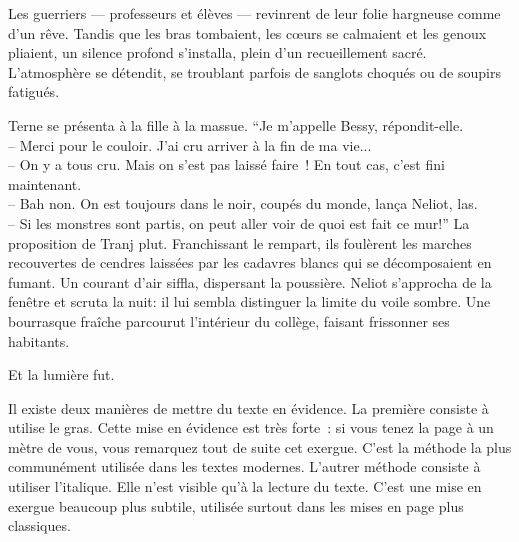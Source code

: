 \documentclass{parch}
\begin{document}
\begin{multicols}{3}
\begin{spacing}{1}
		Les guerriers --- professeurs et élèves --- revinrent de leur folie hargneuse comme d'un rêve. Tandis que les bras tombaient, les c\oe urs se calmaient et les genoux pliaient, un silence profond s'installa, plein d'un recueillement sacré. L'atmosphère se détendit, se troublant parfois de sanglots choqués ou de soupirs fatigués.
		
		Terne se présenta à la fille à la massue. \enquote{Je m'appelle Bessy, répondit-elle.\\
			-- Merci pour le couloir. J'ai cru arriver à la fin de ma vie...\\
			-- On y a tous cru. Mais on s'est pas laissé faire ! En tout cas, c'est fini maintenant.\\
			-- Bah non. On est toujours dans le noir, coupés du monde, lança Neliot, las.\\
			-- Si les monstres sont partis, on peut aller voir de quoi est fait ce mur!} La proposition de Tranj plut. Franchissant le rempart, ils foulèrent les marches recouvertes de cendres laissées par les cadavres blancs qui se décomposaient en fumant. Un courant d'air siffla, dispersant la poussière. Neliot s'approcha de la fenêtre et scruta la nuit: il lui sembla distinguer la limite du voile sombre. Une bourrasque fraîche parcourut l'intérieur du collège, faisant frissonner ses habitants.
		
		Et la lumière fut.
		
		\begin{gridenv}
		\end{gridenv}
		
		\parchHRule
		
		\begin{gridenv}
			\parchTitreArticle{Mise en\\évidence}
		\end{gridenv}
		
		\vspace*{-.5mm}
		\noindent Il existe deux manières de mettre du texte en évidence. La première consiste à utilise le gras. Cette mise en évidence est très forte : si vous tenez la page à un mètre de vous, vous remarquez tout de suite cet exergue. C'est la méthode la plus communément utilisée dans les textes modernes. L'autrer méthode consiste à utiliser l'italique. Elle n'est visible qu'à la lecture du texte. C'est une mise en exergue beaucoup plus subtile, utilisée surtout dans les mises en page plus classiques.
		

\end{spacing}
\end{multicols}
\end{document}
